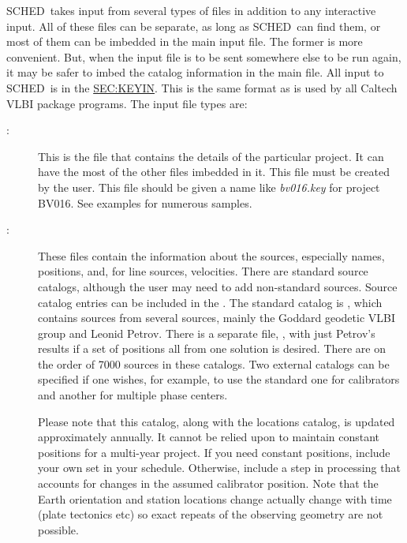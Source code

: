 \documentclass{report}
\newcommand{\schedb}{{\sc SCHED~}}
\begin{document}
\schedb takes input from several types of files in addition to any
interactive input.  All of these files can be separate, as long as
\schedb can find them, or most of them can be imbedded in the main
input file.  The former is more convenient.  But, when the input file
is to be sent somewhere else to be run again, it may be safer to imbed
the catalog information in the main file.  All input to \schedb is in
the \hyperref{keyin free format}{keyin free format (see Section }{)}
{SEC:KEYIN}.  This is the same format as is used by all Caltech VLBI
package programs.  The input file types are:

\begin{description}

\item[:] This is the
file that contains the details of the particular project.  It can have
the most of the other files imbedded in it.  This file must be created
by the user.  This file should be given a name like {\sl bv016.key}
for project BV016.  See 
{examples} for numerous samples.



\item[:] These files contain the
information about the sources, especially names, positions, and, for
line sources, velocities.  There are standard source catalogs,
although the user may need to add non-standard sources.  Source
catalog entries can be included in the .  The standard catalog is , which contains
sources from several sources, mainly the Goddard geodetic VLBI group
and Leonid Petrov.  There is a separate file, , with just
Petrov's results if a set of positions all from one solution is
desired.  There are on the order of 7000 sources in these catalogs.
Two external catalogs can be specified if one wishes, for example, to
use the standard one for calibrators and another for multiple phase
centers.  

Please note that this catalog, along with the locations catalog, is
updated approximately annually.  It cannot be relied upon to maintain
constant positions for a multi-year project.  If you need constant
positions, include your own set in your schedule.  Otherwise, include
a step in processing that accounts for changes in the assumed
calibrator position.  Note that the Earth orientation and station
locations change actually change with time (plate tectonics etc) so
exact repeats of the observing geometry are not possible.


\end{description}
\end{document}
